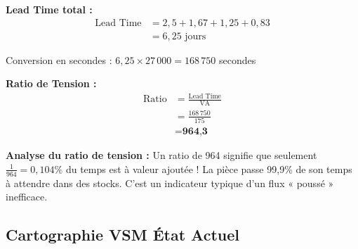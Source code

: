 \documentclass[12pt,a4paper]{article}
\begin{document}
\textbf{Lead Time total :}
\begin{align*}
    \text{Lead Time} &= 2{,}5 + 1{,}67 + 1{,}25 + 0{,}83 \\
    &= 6{,}25 \text{ jours}
\end{align*}

Conversion en secondes : $6{,}25 \times 27\,000 = 168\,750$ secondes

\textbf{Ratio de Tension :}
\begin{align*}
    \text{Ratio} &= \frac{\text{Lead Time}}{\text{VA}} \\
    &= \frac{168\,750}{175} \\
    &= \textbf{964{,}3}
\end{align*}

\begin{tcolorbox}[pedagogique]
\textbf{Analyse du ratio de tension :} Un ratio de 964 signifie que seulement $\frac{1}{964} = 0{,}104\%$ du temps est à valeur ajoutée ! La pièce passe 99,9\% de son temps à attendre dans des stocks. C'est un indicateur typique d'un flux « poussé » inefficace.
\end{tcolorbox}

\subsection{Cartographie VSM État Actuel}
\end{document}
